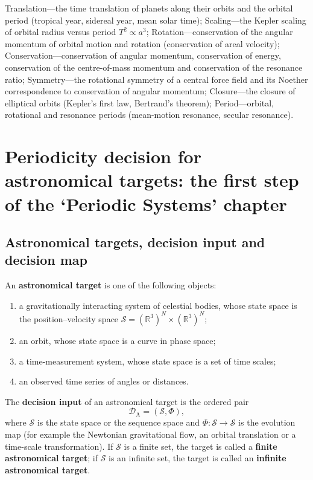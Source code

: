 \begin{remark}\label{rem:astro_seven_themes}
Translation---the time translation of planets along their orbits and the orbital period (tropical year, sidereal year, mean solar time);
Scaling---the Kepler scaling of orbital radius versus period \(T^2\propto a^3\);
Rotation---conservation of the angular momentum of orbital motion and rotation (conservation of areal velocity);
Conservation---conservation of angular momentum, conservation of energy, conservation of the centre-of-mass momentum and conservation of the resonance ratio;
Symmetry---the rotational symmetry of a central force field and its Noether correspondence to conservation of angular momentum;
Closure---the closure of elliptical orbits (Kepler's first law, Bertrand's theorem);
Period---orbital, rotational and resonance periods (mean-motion resonance, secular resonance).
\end{remark}

\section{Periodicity decision for astronomical targets: the first step of the `Periodic Systems' chapter}
\label{sec:astro_periodicity_decision}

\subsection{Astronomical targets, decision input and decision map}

\begin{definition}\label{def:astro_target}
An \textbf{astronomical target} is one of the following objects:
\begin{enumerate}[label=(\roman*)]
    \item a gravitationally interacting system of celestial bodies, whose state space is the position--velocity space \(\mathcal S=(\mathbb R^3)^N\times(\mathbb R^3)^N\);
    \item an orbit, whose state space is a curve in phase space;
    \item a time-measurement system, whose state space is a set of time scales;
    \item an observed time series of angles or distances.
\end{enumerate}
The \textbf{decision input} of an astronomical target is the ordered pair
\[
\mathcal D_{\mathrm{A}}=(\mathcal S,\Phi),
\]
where \(\mathcal S\) is the state space or the sequence space and \(\Phi:\mathcal S\to\mathcal S\) is the evolution map (for example the Newtonian gravitational flow, an orbital translation or a time-scale transformation). If \(\mathcal S\) is a finite set, the target is called a \textbf{finite astronomical target}; if \(\mathcal S\) is an infinite set, the target is called an \textbf{infinite astronomical target}.
\end{definition}

